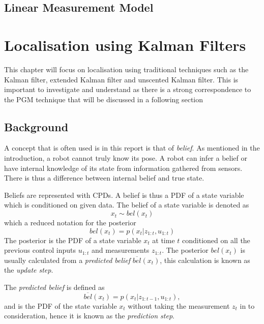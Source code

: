 \documentclass[12pt,oneside,openany,a4paper, %
afrikaans,english,
]{memoir}
\numberwithin{equation}{chapter}
\begin{document}
\section{Linear Measurement Model}

\chapter{Localisation using Kalman Filters}
This chapter will focus on localisation using traditional techniques such as the Kalman filter, extended Kalman filter and unscented Kalman filter. This is important to investigate and understand as there is a strong correspondence to the PGM technique that will be discussed in a following section
\section{Background}
A concept that is often used is in this report is that of \textit{belief}. As mentioned in the introduction, a robot cannot truly know its pose. A robot can infer a belief or have internal knowledge of its state from information gathered from sensors. There is thus a difference between internal belief and true state.

Beliefs are represented with CPDs. A belief is thus a PDF of a state variable which is conditioned on given data. The belief of a state variable is denoted as
\begin{equation}
x_t \sim bel(x_t)
\end{equation}
which a reduced notation for the posterior
\begin{equation}
bel(x_t) = p(x_t| z_{1:t}, u_{1:t})
\end{equation}
The posterior is the PDF of a state variable $x_t$ at time $t$ conditioned on all the previous control inputs $u_{1:t}$ and measurements $z_{1:t}$. The posterior $bel(x_t)$ is usually calculated from a \textit{predicted belief} $\overline{bel}(x_t)$, this calculation is known as the \textit{update step}.

The \textit{predicted belief} is defined as
\begin{equation}
\overline{bel}(x_t) = p(x_t|z_{1:t-1}, u_{1:t}),
\end{equation} 
and is the PDF of the state variable $x_t$ without taking the measurement $z_t$ in to consideration, hence it is known as the \textit{prediction step}.
\end{document}
